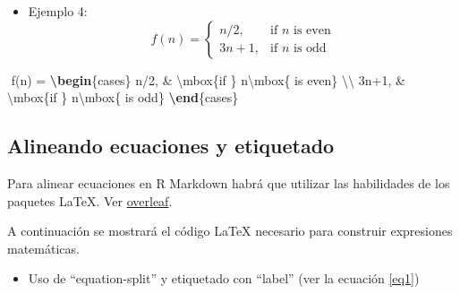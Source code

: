 \documentclass[12pt,a4paper,]{book}
\newenvironment{Shaded}{\begin{snugshade}}{\end{snugshade}}
\newcommand{\ExtensionTok}[1]{#1}
\newcommand{\KeywordTok}[1]{\textcolor[rgb]{0.13,0.29,0.53}{\textbf{#1}}}
\newcommand{\NormalTok}[1]{#1}
\newcommand{\SpecialCharTok}[1]{\textcolor[rgb]{0.00,0.00,0.00}{#1}}
\newcommand{\SpecialStringTok}[1]{\textcolor[rgb]{0.31,0.60,0.02}{#1}}
\providecommand{\tightlist}{%
  \setlength{\itemsep}{0pt}\setlength{\parskip}{0pt}}
\numberwithin{dummy}{section}
\theoremstyle{ocrenumbox}
\theoremstyle{blacknumex}
\theoremstyle{blacknumbox}
\theoremstyle{ocrenum}
\theoremstyle{ocrenum}
\begin{document}
\begin{itemize}
\tightlist
\item
  Ejemplo 4: \[
  f(n) = 
  \begin{cases} 
  n/2,  & \mbox{if } n\mbox{ is even} \\ 
  3n+1, & \mbox{if } n\mbox{ is odd} 
  \end{cases}
  \]
\end{itemize}

\begin{Shaded}
\begin{Highlighting}[]
\SpecialStringTok{$$}
\SpecialStringTok{f(n) = }
\KeywordTok{\textbackslash{}begin}\NormalTok{\{}\ExtensionTok{cases}\NormalTok{\}}\SpecialStringTok{ }
\SpecialStringTok{  n/2,  \& }\SpecialCharTok{\textbackslash{}mbox}\NormalTok{\{if \}}\SpecialStringTok{ n}\SpecialCharTok{\textbackslash{}mbox}\SpecialStringTok{\{ is even\} }\SpecialCharTok{\textbackslash{}\textbackslash{}}\SpecialStringTok{ }
\SpecialStringTok{  3n+1, \& }\SpecialCharTok{\textbackslash{}mbox}\NormalTok{\{if \}}\SpecialStringTok{ n}\SpecialCharTok{\textbackslash{}mbox}\SpecialStringTok{\{ is odd\} }
\KeywordTok{\textbackslash{}end}\NormalTok{\{}\ExtensionTok{cases}\NormalTok{\}}
\SpecialStringTok{$$}
\end{Highlighting}
\end{Shaded}

\hypertarget{etiquetadomatematico}{%
\subsection{Alineando ecuaciones y
etiquetado}\label{etiquetadomatematico}}

Para alinear ecuaciones en R Markdown habrá que utilizar las habilidades
de los paquetes LaTeX. Ver
\href{https://www.overleaf.com/learn/latex/Aligning_equations_with_amsmath}{overleaf}.

A continuación se mostrará el código LaTeX necesario para construir
expresiones matemáticas.

\begin{itemize}
\tightlist
\item
  Uso de ``equation-split'' y etiquetado con ``label'' (ver la ecuación
  \ref{eq1})
\end{itemize}
\end{document}
